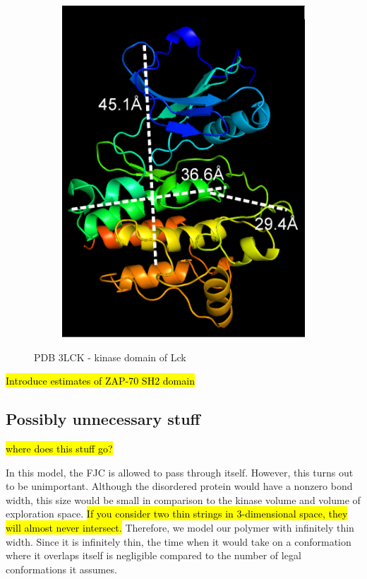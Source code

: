 \documentclass[../AdvancementSummary.tex]{subfiles}
\begin{document}
\begin{figure}[H]
\begin{center}
\begin{subfigure}{0.4\linewidth}
\includegraphics[width=\linewidth]{LckPyMol/LWD.eps}
\caption{}
\end{subfigure}
\end{center}
\caption{PDB 3LCK - kinase domain of Lck \label{fig: LckPyMol}}
\end{figure}

\hl{Introduce estimates of ZAP-70 SH2 domain}


\subsection{Possibly unnecessary stuff}

\hl{where does this stuff go?}

In this model, the FJC is allowed to pass through itself. However, this turns out to be unimportant. Although the disordered protein would have a nonzero bond width, this size would be small in comparison to the kinase volume and volume of exploration space.  \hl{If you consider two thin strings in 3-dimensional space, they will almost never intersect.}  Therefore, we model our polymer with infinitely thin width.  Since it is infinitely thin, the time when it would take on a conformation where it overlaps itself is negligible compared to the number of legal conformations it assumes.
\end{document}
